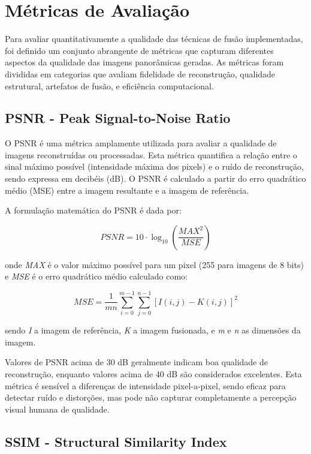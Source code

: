\section{Métricas de Avaliação}

Para avaliar quantitativamente a qualidade das técnicas de fusão implementadas, foi definido um conjunto abrangente de métricas que capturam diferentes aspectos da qualidade das imagens panorâmicas geradas. As métricas foram divididas em categorias que avaliam fidelidade de reconstrução, qualidade estrutural, artefatos de fusão, e eficiência computacional.

\subsection{PSNR - Peak Signal-to-Noise Ratio}

O PSNR é uma métrica amplamente utilizada para avaliar a qualidade de imagens reconstruídas ou processadas. Esta métrica quantifica a relação entre o sinal máximo possível (intensidade máxima dos pixels) e o ruído de reconstrução, sendo expressa em decibéis (dB). O PSNR é calculado a partir do erro quadrático médio (MSE) entre a imagem resultante e a imagem de referência.

A formulação matemática do PSNR é dada por:

\begin{equation}
PSNR = 10 \cdot \log_{10}\left(\frac{MAX^2}{MSE}\right)
\end{equation}

\noindent onde \textit{MAX} é o valor máximo possível para um pixel (255 para imagens de 8 bits) e \textit{MSE} é o erro quadrático médio calculado como:

\begin{equation}
MSE = \frac{1}{mn}\sum_{i=0}^{m-1}\sum_{j=0}^{n-1}[I(i,j) - K(i,j)]^2
\end{equation}

\noindent sendo \textit{I} a imagem de referência, \textit{K} a imagem fusionada, e \textit{m} e \textit{n} as dimensões da imagem.

Valores de PSNR acima de 30 dB geralmente indicam boa qualidade de reconstrução, enquanto valores acima de 40 dB são considerados excelentes. Esta métrica é sensível a diferenças de intensidade pixel-a-pixel, sendo eficaz para detectar ruído e distorções, mas pode não capturar completamente a percepção visual humana de qualidade.

\subsection{SSIM - Structural Similarity Index}

